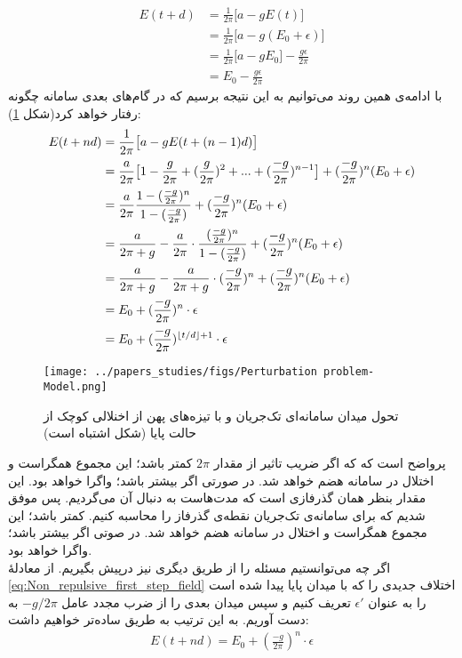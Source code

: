 \begin{align}
	E(t+d) &= \frac{1}{2\pi} \big[ a - g E(t) \big]\\
	&=  \frac{1}{2\pi} \big[ a - g (E_0 + \epsilon) \big]\\
	&=  \frac{1}{2\pi} \big[ a - g E_0 \big] - \frac{g\epsilon}{2\pi}\\
	&= E_0 - \frac{g\epsilon}{2\pi} \label{eq:Non_repulsive_first_step_field}
\end{align}
با ادامه‌ی همین روند می‌توانیم به این نتیجه برسیم که در گام‌های بعدی سامانه چگونه رفتار خواهد کرد(شکل \ref{fig:non_repulsive_single_input_perturbation}): 
\begin{align}
	E(t + nd) &= \frac{1}{2\pi} \big[ a - g E(t+(n-1)d) \big]\\
	&= \frac{a}{2\pi} \big[ 1 - \frac{g}{2\pi} + (\frac{g}{2\pi})^2 + ... + (\frac{-g}{2\pi})^{n - 1} \big] + (\frac{-g}{2\pi})^{n} (E_0 + \epsilon)
	\label{eq:geometric_sum}\\
	&= \frac{a}{2\pi} \frac{1 - (\frac{-g}{2\pi})^{n} }{ 1 - (\frac{-g}{2\pi})} + (\frac{-g}{2\pi})^{n} (E_0 + \epsilon)\\
	&= \frac{a}{2\pi + g} - \frac{a}{2\pi} \cdot \frac{ (\frac{-g}{2\pi})^{n} }{ 1 - (\frac{-g}{2\pi})} + (\frac{-g}{2\pi})^{n} (E_0 + \epsilon)\\
	&= \frac{a}{2\pi + g} - \frac{a}{2\pi + g} \cdot (\frac{-g}{2\pi})^{n} + (\frac{-g}{2\pi})^{n} (E_0 + \epsilon)\\
	&= E_0 + (\frac{-g}{2\pi})^n \cdot \epsilon\\
	&= E_0 + (\frac{-g}{2\pi})^{\left\lfloor t/d \right\rfloor + 1} \cdot \epsilon
\end{align}

\begin{figure}[h]
	\centering
	\texttt{[image: ../papers\_studies/figs/Perturbation problem-Model.png]}
	\caption{
		تحول میدان سامانه‌ای تک‌جریان و با تیزه‌های پهن از اخنلالی کوچک از حالت پایا (شکل اشتباه است)
	}
	\label{fig:non_repulsive_single_input_perturbation}
\end{figure}

پرواضح است که که اگر ضریب تاثیر از مقدار 
$2\pi$
کمتر باشد؛ این مجموع همگراست و اختلال در سامانه هضم خواهد شد. در صورتی اگر بیشتر باشد؛ واگرا خواهد بود. این مقدار بنظر همان گذرفازی است که مدت‌هاست به دنبال آن می‌گردیم. پس موفق شدیم که برای سامانه‌ی تک‌جریان نقطه‌ی گذرفاز را محاسبه کنیم. کمتر باشد؛ این مجموع همگراست و اختلال در سامانه‌ هضم خواهد شد. در صوتی اگر بیشتر باشد؛ واگرا خواهد بود.\\
اگر چه می‌توانستیم مسئله را از طریق دیگری نیز درپیش بگیریم. از معادلهٔ 
\ref{eq:Non_repulsive_first_step_field}
اختلاف جدیدی را که با میدان پایا پیدا شده است را به عنوان 
$\epsilon'$
تعریف کنیم و سپس میدان بعدی را از ضرب مجدد عامل
$ - g/2\pi$
به دست آوریم. به این ترتیب به طریق ساده‌تر خواهیم داشت:
\begin{align}
	E(t+nd) = E_0 + (\frac{-g}{2\pi})^n \cdot \epsilon
\end{align}

